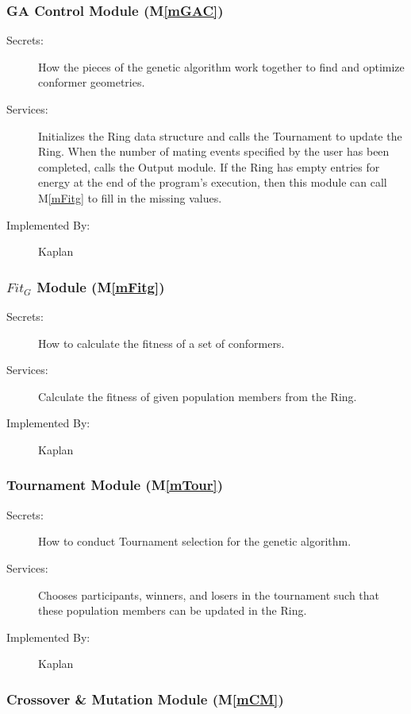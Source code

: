 \documentclass[12pt, titlepage]{article}
\newcommand{\mref}[1]{M\ref{#1}}
\newcommand{\progname}{Kaplan} %
\begin{document}
\subsubsection{GA Control Module (\mref{mGAC})}

\begin{description}
	\item[Secrets:] How the pieces of the genetic algorithm work together to 
	find and optimize conformer geometries.
	\item[Services:] Initializes the Ring data structure and calls the 
	Tournament to update the Ring. When the number of mating events specified 
	by the user has been completed, calls the Output module. If the Ring has 
	empty entries for energy at the end of the program's execution, then this 
	module can call \mref{mFitg} to fill in the missing values.
	\item[Implemented By:] \progname{}
\end{description}

\subsubsection{$Fit_G$ Module (\mref{mFitg})}

\begin{description}
	\item[Secrets:] How to calculate the fitness of a set of conformers.
	\item[Services:] Calculate the fitness of given population members from the 
	Ring.
	\item[Implemented By:] \progname{}
\end{description}

\subsubsection{Tournament Module (\mref{mTour})}

\begin{description}
	\item[Secrets:] How to conduct Tournament selection for the genetic 
	algorithm.
	\item[Services:] Chooses participants, winners, and losers in the 
	tournament such that these population members can be updated in the Ring.
	\item[Implemented By:] \progname{}
\end{description}

\subsubsection{Crossover \& Mutation Module (\mref{mCM})}
\end{document}
